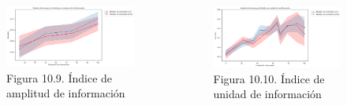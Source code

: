 \documentclass{beamer}
\begin{document}
\begin{frame}
	\begin{columns}[c]
		\begin{column}{.5\textwidth}
			\begin{figure}
				\centering
				\includegraphics[width=1\textwidth]{figs/cap7/figura_43}
				\caption{Figura 10.9. Índice de amplitud de información}
			\end{figure}      
		\end{column}
		\begin{column}{.5\textwidth}
			\begin{figure}
				\centering
				\includegraphics[width=1\textwidth]{figs/cap7/figura_44}
				\caption{Figura 10.10. Índice de unidad de información}
			\end{figure}
		\end{column}
	\end{columns}
	
\end{frame}
\end{document}
